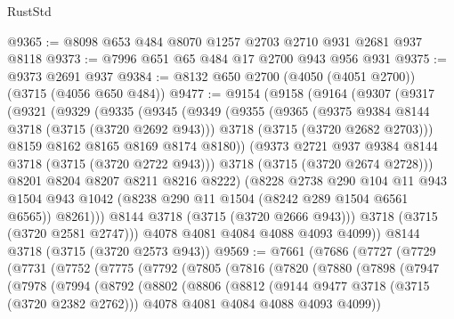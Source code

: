 \begin{lexlean}{RustStd}
\begin{coremodule}
@9365 := @8098 @653 @484 @8070 @1257 @2703 @2710 @931 @2681 @937 @8118
@9373 := @7996 @651 @65 @484 @17 @2700 @943 @956 @931
@9375 := @9373 @2691 @937
@9384 := @8132 @650 @2700 (@4050 (@4051 @2700)) (@3715 (@4056 @650 @484))
@9477 := @9154
    (@9158
      (@9164
        (@9307
          (@9317
            (@9321
              (@9329
                (@9335
                  (@9345
                    (@9349
                      (@9355
                        (@9365
                          (@9375 @9384 @8144 @3718 (@3715 (@3720 @2692 @943)))
                          @3718
                          (@3715 (@3720 @2682 @2703)))
                        @8159
                        @8162
                        @8165
                        @8169
                        @8174
                        @8180))
                    (@9373 @2721 @937 @9384 @8144 @3718 (@3715 (@3720 @2722 @943)))
                    @3718
                    (@3715 (@3720 @2674 @2728)))
                  @8201
                  @8204
                  @8207
                  @8211
                  @8216
                  @8222)
                (@8228
                  @2738
                  @290
                  @104
                  @11
                  @943
                  @1504
                  @943
                  @1042
                  (@8238 @290 @11 @1504 (@8242 @289 @1504 @6561 @6565))
                  @8261)))
            @8144
            @3718
            (@3715 (@3720 @2666 @943)))
          @3718
          (@3715 (@3720 @2581 @2747)))
        @4078
        @4081
        @4084
        @4088
        @4093
        @4099))
    @8144
    @3718
    (@3715 (@3720 @2573 @943))
@9569 := @7661
    (@7686
      (@7727
        (@7729
          (@7731
            (@7752
              (@7775
                (@7792
                  (@7805
                    (@7816
                      (@7820
                        (@7880
                          (@7898
                            (@7947
                              (@7978
                                (@7994
                                  (@8792
                                    (@8802
                                      (@8806
                                        (@8812
                                          (@9144 @9477 @3718 (@3715 (@3720 @2382 @2762)))
                                          @4078
                                          @4081
                                          @4084
                                          @4088
                                          @4093
                                          @4099))

\end{coremodule}
\end{lexlean}
